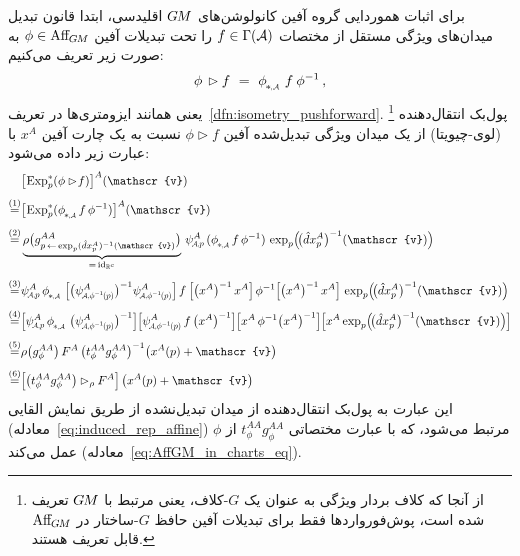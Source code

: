 برای اثبات هموردایی گروه آفین کانولوشن‌های $G\mkern-1.4muM$ اقلیدسی، ابتدا قانون تبدیل میدان‌های ویژگی مستقل از مختصات $f\in \Gamma(\mathcal{A})$ را تحت تبدیلات آفین $\phi \in \operatorname{Aff}_{\mkern-2muG\mkern-1.4muM}$ به صورت زیر تعریف می‌کنیم:
\begin{align}\label{eq:affine_action_sections}
	\phi \,\rhd f\ =\ \dphiA\, f\: \phi^{-1} \,,
\end{align}
یعنی همانند ایزومتری‌ها در تعریف~\ref{dfn:isometry_pushforward}.%
\footnote{
	از آنجا که کلاف بردار ویژگی به عنوان یک $G$-کلاف، یعنی مرتبط با $G\mkern-1.4muM$ تعریف شده است، پوش‌فورواردها فقط برای تبدیلات آفین حافظ $G$-ساختار در $\operatorname{Aff}_{\mkern-2muG\mkern-1.4muM}$ قابل تعریف هستند.
}
پول‌بک انتقال‌دهنده (لوی-چیویتا) از یک میدان ویژگی تبدیل‌شده آفین $\phi \rhd\! f$ نسبت به یک چارت آفین $x^A$ با عبارت زیر داده می‌شود:
\begin{align}\label{eq:affine_transformed_transporter_pullback}
	& \big[\mkern-2mu \Expsp (\phi \rhd\! f) \big]^A (\mathscr{v})
	\notag \\[.8ex]
	\overset{(1)}{=}& 
	\big[\mkern-2mu \Expsp (\dphiA f\, \phi^{-1}) \big]^A (\mathscr{v})
	\notag \\[.8ex]
	\overset{(2)}{=}& 
	\underbrace{\rho\big( g^{AA}_{p \,\leftarrow\, \exp_p (\hat{d}x_p^A)^{-1}(\mathscr{v})} \big)}_{=\, \id_{\R^c}} \,
	\psiAp^A\, (\dphiA f\, \phi^{-1})\,
	\exp_p \!\pig(\! \big(\hat{d}x_p^A \big)^{-1}(\mathscr{v}) \pig)
	\notag \\[.8ex]
	\overset{(3)}{=}& 
	\psiAp^A\, \dphiA\,
	\pig[ \big( \psiAphiinvp^A \big)^{-1} \psiAphiinvp^A\pig]\, 
	f\: 
	\pig[ \big(x^A \big)^{-1}\, x^A\pig]\, 
	\phi^{-1} 
	\pig[ \big(x^A \big)^{-1}\, x^A\pig]\, 
	\exp_p \!\pig(\! \big(\hat{d}x_p^A \big)^{-1}(\mathscr{v}) \pig)
	\notag \\[.8ex]
	\overset{(4)}{=}& 
	\pig[\psiAp^A\, \dphiA\, \big(\psiAphiinvp^A \big)^{-1}\pig]
	\pig[\psiAphiinvp^A\, f\, \big(x^A \big)^{-1}\pig]
	\pig[x^A\, \phi^{-1} \big(x^A \big)^{-1}\pig]
	\pig[x^A \exp_p \!\pig(\! \big(\hat{d}x_p^A \big)^{-1}(\mathscr{v}) \pig) \pig]
	\notag \\[.8ex]
	\overset{(5)}{=}& 
	\rho\big( g_\phi^{AA} \big)\, F^A\, \big( t_\phi^{AA} g_\phi^{AA} \big)^{-1} \big(x^A(p) + \mathscr{v} \big)
	\notag \\[.8ex]
	\overset{(6)}{=}& 
	\pig[\big( t_\phi^{AA} g_\phi^{AA} \big) \rhd_\rho F^A \pig]\, \big(x^A(p) + \mathscr{v} \big)
\end{align}
این عبارت به پول‌بک انتقال‌دهنده از میدان تبدیل‌نشده از طریق نمایش القایی (معادله~\eqref{eq:induced_rep_affine}) مرتبط می‌شود، که با عبارت مختصاتی $t_\phi^{AA} g_\phi^{AA}$ از $\phi$ عمل می‌کند (معادله~\eqref{eq:AffGM_in_charts_eq}).
